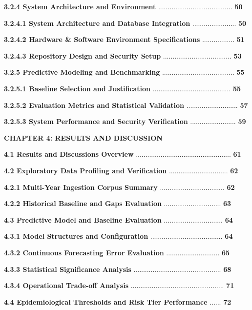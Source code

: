 \documentclass[
]{article}
\begin{document}
\textbf{3.2.4 System Architecture and Environment}
....................................... \textbf{50}

\textbf{3.2.4.1 System Architecture and Database Integration}
....................... \textbf{50}

\textbf{3.2.4.2 Hardware \& Software Environment Specifications}
................. \textbf{51}

\textbf{3.2.4.3 Repository Design and Security Setup}
.................................... \textbf{53}

\textbf{3.2.5 Predictive Modeling and Benchmarking}
...................................... \textbf{55}

\textbf{3.2.5.1 Baseline Selection and Justification}
......................................... \textbf{55}

\textbf{3.2.5.2 Evaluation Metrics and Statistical Validation}
........................... \textbf{57}

\textbf{3.2.5.3 System Performance and Security Verification}
........................ \textbf{59}

\textbf{CHAPTER 4: RESULTS AND DISCUSSION}

\textbf{4.1 Results and Discussions Overview}
.................................................. \textbf{61}

\textbf{4.2 Exploratory Data Profiling and Verification}
............................... \textbf{62}

\textbf{4.2.1 Multi-Year Ingestion Corpus Summary}
.................................. \textbf{62}

\textbf{4.2.2 Historical Baseline and Gaps Evaluation}
.............................. \textbf{63}

\textbf{4.3 Predictive Model and Baseline Evaluation}
............................... \textbf{64}

\textbf{4.3.1 Model Structures and Configuration}
...................................... \textbf{64}

\textbf{4.3.2 Continuous Forecasting Error Evaluation}
............................ \textbf{65}

\textbf{4.3.3 Statistical Significance Analysis}
.............................................. \textbf{68}

\textbf{4.3.4 Operational Trade-off Analysis}
................................................. \textbf{71}

\textbf{4.4 Epidemiological Thresholds and Risk Tier Performance} ......
\textbf{72}
\end{document}
